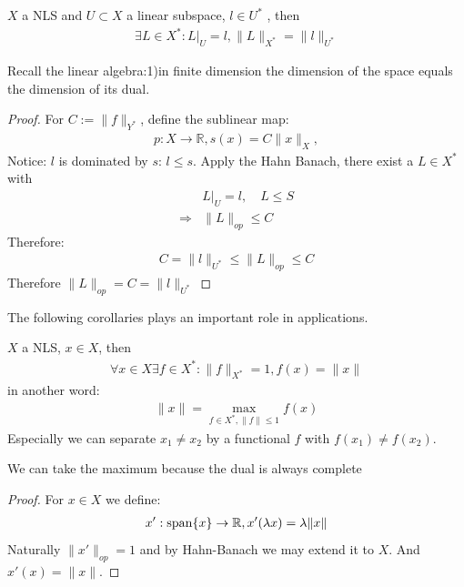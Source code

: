 \begin{theorem}
	$X$ a NLS and $U\subset X$ a linear subspace, $l \in U^*$ , then 
	\begin{align*}
		\exists L \in X^*: L|_U = l, \|L\|_{X^*} = \|l\|_{U^*}
	\end{align*}
\end{theorem}
\begin{remark}
	Recall the linear algebra:1)in finite dimension the dimension of the space equals the dimension of its dual. 
\end{remark}
\begin{proof}
	For $C:= \|f\|_{Y^*}$, define the sublinear map:
	\begin{align*}
		p: X \rightarrow \mathbb{R},   s(x) = C\|x\|_X, 
	\end{align*}
	Notice: $l$ is dominated by $s$: $l\leq s$. Apply the Hahn Banach, there exist a $L \in X^*$ with
	\begin{align*}
					&L|_U = l, \quad L \leq S\\
		\Rightarrow &\|L\|_{op} \leq C 
	\end{align*}
	Therefore:
	\begin{align*}
		C = \|l\|_{U^*} \leq \|L\|_{op} \leq C
	\end{align*}
	Therefore $\|L\|_{op} = C = \|l\|_{U^*}$
\end{proof}

The following corollaries plays an important role in applications.
\begin{corollary}
	$X$ a NLS, $x \in X$, then 
	\begin{align*}
		\forall x \in X\exists f \in X^*: \|f\|_{X^*} = 1, f(x) = \|x\|
	\end{align*}
	in another word:
	\begin{align*}
		\|x\| = \max_{f \in X^*, \|f\| \leq 1} f(x) 
	\end{align*}
	Especially we can separate $x_1 \neq x_2$ by a functional $f$ with $f(x_1) \neq f(x_2)$. 
\end{corollary}
\begin{remark}
We can take the maximum because the dual is always complete 
\end{remark}
\begin{proof}
	For $x \in X$ we define:
	\begin{align*}
		x': \operatorname*{span}\{x\} \rightarrow \mathbb{R}, x'(\lambda x) = \lambda\|x\|
	\end{align*}
	Naturally $\|x'\|_{op} = 1$ and by Hahn-Banach we may extend it to $X$. And $x'(x) = \|x\|$.
\end{proof}

